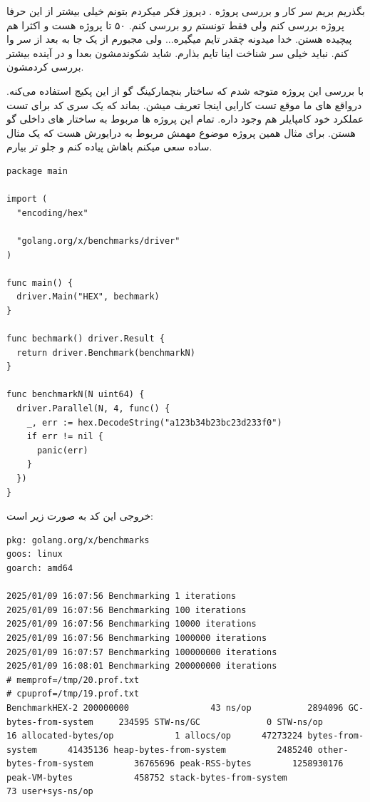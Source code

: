 بگذریم بریم سر کار و بررسی پروژه . دیروز فکر میکردم بتونم خیلی بیشتر از این حرفا پروژه بررسی کنم ولی فقط تونستم 
رو بررسی کنم. ۵۰ تا پروژه هست و اکثرا هم پیچیده هستن. خدا میدونه چقدر تایم میگیره... ولی مجبورم از یک جا به بعد از سر وا کنم.
نباید خیلی سر شناخت اینا تایم بذارم. شاید شکوندمشون بعدا و در آینده بیشتر بررسی کردمشون.

با بررسی این پروژه متوجه شدم که ساختار بنچمارکینگ گو از این پکیج استفاده می‌کنه. درواقع  های ما موقع تست کارایی اینجا تعریف
میشن. بماند که یک سری کد برای تست عملکرد خود کامپایلر هم وجود داره. تمام این پروژه ها مربوط به ساختار های داخلی گو هستن.
برای مثال همین پروژه موضوع مهمش مربوط به درایورش هست که یک مثال ساده سعی میکنم باهاش پیاده کنم و جلو تر بیارم.

\begin{latin}
\begin{verbatim}
package main

import (
  "encoding/hex"

  "golang.org/x/benchmarks/driver"
)

func main() {
  driver.Main("HEX", bechmark)
}

func bechmark() driver.Result {
  return driver.Benchmark(benchmarkN)
}

func benchmarkN(N uint64) {
  driver.Parallel(N, 4, func() {
    _, err := hex.DecodeString("a123b34b23bc23d233f0")
    if err != nil {
      panic(err)
    }
  })
}
\end{verbatim}
\end{latin}

خروجی این کد به صورت زیر است:
\begin{latin}

\begin{verbatim}
pkg: golang.org/x/benchmarks
goos: linux
goarch: amd64

2025/01/09 16:07:56 Benchmarking 1 iterations
2025/01/09 16:07:56 Benchmarking 100 iterations
2025/01/09 16:07:56 Benchmarking 10000 iterations
2025/01/09 16:07:56 Benchmarking 1000000 iterations
2025/01/09 16:07:57 Benchmarking 100000000 iterations
2025/01/09 16:08:01 Benchmarking 200000000 iterations
# memprof=/tmp/20.prof.txt
# cpuprof=/tmp/19.prof.txt
BenchmarkHEX-2 200000000                43 ns/op           2894096 GC-bytes-from-system     234595 STW-ns/GC             0 STW-ns/op            16 allocated-bytes/op            1 allocs/op      47273224 bytes-from-system      41435136 heap-bytes-from-system          2485240 other-bytes-from-system        36765696 peak-RSS-bytes        1258930176 peak-VM-bytes            458752 stack-bytes-from-system              73 user+sys-ns/op
\end{verbatim}
\end{latin}

